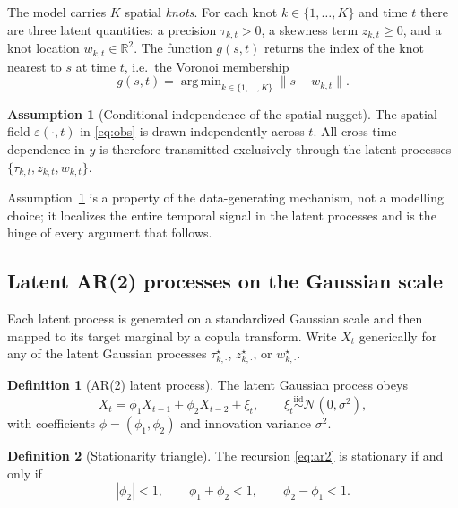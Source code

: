 \documentclass[11pt]{article}
\theoremstyle{definition}
\newtheorem{definition}{Definition}
\newtheorem{assumption}{Assumption}
\theoremstyle{remark}
\newcommand{\R}{\mathbb{R}}
\newcommand{\Norm}{\mathcal{N}}
\DeclareMathOperator*{\argmin}{arg\,min}
\begin{document}
The model carries $K$ spatial \emph{knots}. For each knot
$k \in \{1,\dots,K\}$ and time $t$ there are three latent quantities:
a precision $\tau_{k,t}>0$, a skewness term $z_{k,t}\ge 0$, and a knot
location $w_{k,t}\in\R^2$. The function $g(s,t)$ returns the index of
the knot nearest to $s$ at time $t$, i.e.\ the Voronoi membership
\begin{equation}
  g(s,t) = \argmin_{k\in\{1,\dots,K\}}
            \big\| s - w_{k,t} \big\|.
  \label{eq:membership}
\end{equation}

\begin{assumption}[Conditional independence of the spatial nugget]
\label{ass:iid-space}
The spatial field $\varepsilon(\cdot,t)$ in \eqref{eq:obs} is drawn
independently across $t$. All cross-time dependence in $y$ is therefore
transmitted exclusively through the latent processes
$\{\tau_{k,t}, z_{k,t}, w_{k,t}\}$.
\end{assumption}

Assumption~\ref{ass:iid-space} is a property of the data-generating
mechanism, not a modelling choice; it localizes the entire temporal
signal in the latent processes and is the hinge of every argument that
follows.

\subsection{Latent AR(2) processes on the Gaussian scale}

Each latent process is generated on a standardized Gaussian scale and
then mapped to its target marginal by a copula transform. Write
$X_t$ generically for any of the latent Gaussian processes
$\tau^\star_{k,\cdot}$, $z^\star_{k,\cdot}$, or $w^\star_{k,\cdot}$.

\begin{definition}[AR(2) latent process]
\label{def:ar2}
The latent Gaussian process obeys
\begin{equation}
  X_t = \phi_1 X_{t-1} + \phi_2 X_{t-2} + \xi_t,
  \qquad \xi_t \overset{\text{iid}}{\sim} \Norm(0,\sigma^2),
  \label{eq:ar2}
\end{equation}
with coefficients $\phi=(\phi_1,\phi_2)$ and innovation variance
$\sigma^2$.
\end{definition}

\begin{definition}[Stationarity triangle]
\label{def:stationary}
The recursion \eqref{eq:ar2} is stationary if and only if
\begin{equation}
  |\phi_2| < 1,
  \qquad \phi_1 + \phi_2 < 1,
  \qquad \phi_2 - \phi_1 < 1.
  \label{eq:triangle}
\end{equation}
\end{definition}
\end{document}
